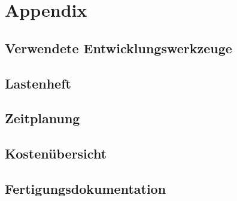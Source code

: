 \documentclass[a4paper, 12pt, twoside, openright
]{memoir}
\begin{document}
\appendix
\part{Appendix}
\chapter{Verwendete Entwicklungswerkzeuge}
\chapter{Lastenheft}
\chapter{Zeitplanung}
\chapter{Kostenübersicht}
\chapter{Fertigungsdokumentation}

\printacronyms
\end{document}
